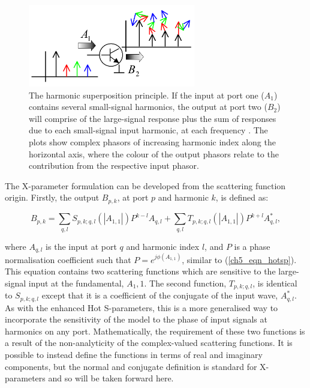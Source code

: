 \documentclass[../thesis/thesis.tex]{subfiles}
\begin{document}
\begin{refsection}
\begin{figure}
	\centering
	\includegraphics[width=0.65\textwidth]{superposition}
	\caption[The harmonic superposition principle.]{The harmonic superposition principle. If the input at port one ($A_1$) contains several small-signal harmonics, the output at port two ($B_2$) will comprise of the large-signal response plus the sum of responses due to each small-signal input harmonic, at each frequency \cite{Verspecht_2006}. The plots show complex phasors of increasing harmonic index along the horizontal axis, where the colour of the output phasors relate to the contribution from the respective input phasor.}
	\label{ch5_fig_superposition}
\end{figure}

The X-parameter formulation can be developed from the scattering function origin. Firstly, the output $B_{p, k}$, at port $p$ and harmonic $k$, is defined as:

\begin{equation}
	B_{p, k} = \sum_{q,l}S_{p, k;q, l}(|A_{1,1}|)P^{k-l}A_{q, l} + 
	\sum_{q,l}T_{p, k;q, l}(|A_{1,1}|)P^{k+l}A_{q, l}^*,
\end{equation}

where $A_{q,l}$ is the input at port $q$ and harmonic index $l$, and $P$ is a phase normalisation coefficient such that $P=e^{j\phi(A_{1,1})}$, similar to (\ref{ch5_eqn_hotsp}). This equation contains two scattering functions which are sensitive to the large-signal input at the fundamental, $A_1,1$. The second function, $T_{p, k;q, l}$, is identical to $S_{p, k;q, l}$ except that it is a coefficient of the conjugate of the input wave, $A_{q, l}^*$. As with the enhanced Hot S-parameters, this is a more generalised way to incorporate the sensitivity of the model to the phase of input signals at harmonics on any port. Mathematically, the requirement of these two functions is a result of the non-analyticity of the complex-valued scattering functions. It is possible to instead define the functions in terms of real and imaginary components, but the normal and conjugate definition is standard for X-parameters and so will be taken forward here.


\end{refsection}
\end{document}
